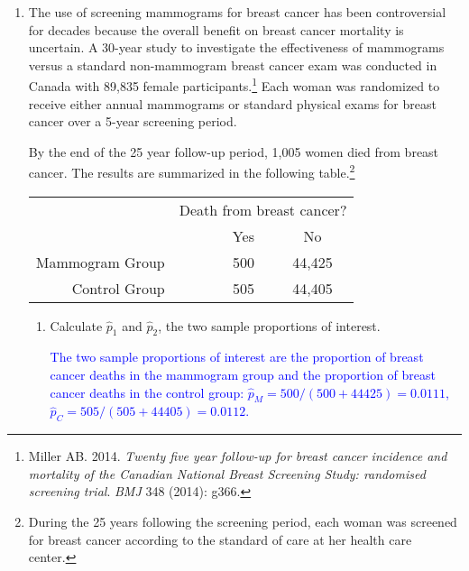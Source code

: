 \documentclass[letterpaper,12pt,twoside,]{pinp}
\begin{document}
\begin{enumerate}
\def\labelenumi{\arabic{enumi}.}
\item
  The use of screening mammograms for breast cancer has been
  controversial for decades because the overall benefit on breast cancer
  mortality is uncertain. A 30-year study to investigate the
  effectiveness of mammograms versus a standard non-mammogram breast
  cancer exam was conducted in Canada with 89,835 female
  participants.\footnote{Miller AB. 2014. \emph{Twenty five year follow-up for breast cancer incidence and mortality of the Canadian National Breast Screening Study: randomised screening trial}. \textit{BMJ} 348 (2014): g366. }
  Each woman was randomized to receive either annual mammograms or
  standard physical exams for breast cancer over a 5-year screening
  period.

  By the end of the 25 year follow-up period, 1,005 women died from
  breast cancer. The results are summarized in the following
  table.\footnote{During the 25 years following the screening period, each woman was screened for breast cancer according to the standard of care at her health care center. }

  \begin{table}[h]
   \centering
   \begin{tabular}{rrcc}
       & \multicolumn{3}{c}{Death from breast cancer?} \\
       \cline{2-4}
       & \ \hspace{3mm}\ & Yes & No \\
       \hline
       Mammogram Group && 500 & 44,425 \\
       Control Group && 505 & 44,405 \\
       \hline
   \end{tabular}
  \end{table}

  \begin{enumerate}
  \def\labelenumii{\alph{enumii})}
  \item
    Calculate \(\hat{p}_1\) and \(\hat{p}_2\), the two sample
    proportions of interest.

    \textcolor{blue}{The two sample proportions of interest are the proportion of breast cancer deaths in the mammogram group and the proportion of breast cancer deaths in the control group: $\hat{p}_M = 500/(500 + 44425) = 0.0111$, $\hat{p}_C = 505/(505 + 44405) = 0.0112$.}
  \end{enumerate}

\begin{Shaded}
\begin{Highlighting}[]
\StringTok{ }\NormalTok{(}\NormalTok{, }\NormalTok{)}
\StringTok{ }\NormalTok{(} \OperatorTok{+}\StringTok{ }\NormalTok{, } \OperatorTok{+}\StringTok{ }\NormalTok{)}
\StringTok{ }\OperatorTok{/}
\end{Highlighting}
\end{Shaded}


\end{enumerate}
\end{document}
